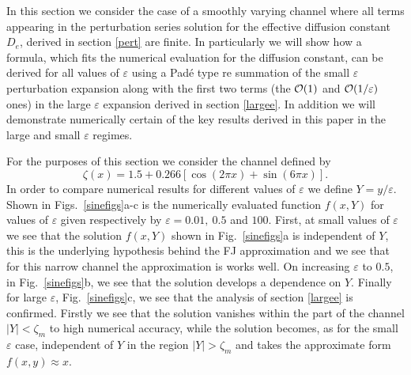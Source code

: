 \documentclass[pre,showpacs,preprintnumbers,amsmath,amssymb,superscriptaddress]{revtex4-1}
\begin{document}
{{In this section we consider the case of a smoothly varying channel where all terms appearing in the perturbation series
solution for the effective diffusion constant $D_e$, derived in section \ref{pert} are finite. In particularly we will show how a formula, which fits the numerical evaluation for the diffusion constant, can be derived for all values of $\varepsilon$ using a Pad\'e type re summation of the small $\varepsilon$ perturbation expansion along with the first two terms (the ${\cal O}(1)$ and ${\cal O}(1/\varepsilon)$ ones) in 
the large $\varepsilon$ expansion derived in section \ref{largee}. In addition we will demonstrate numerically certain of the key results derived in this paper in the large and small $\varepsilon$ regimes. 

For the purposes of this section we consider the channel defined by
\begin{equation}
\zeta(x)=1.5+0.266\left[\cos(2\pi x)+\sin(6\pi x)\right].\label{esch}
\end{equation}
In order to compare numerical results for different values of $\varepsilon$ we define $Y = y/\varepsilon$. Shown in Figs.~\ref{sinefigs}a-c is the numerically evaluated function $f(x,Y)$ for values of $\varepsilon$ given respectively by $\varepsilon= 0.01,\ 0.5$ and $100$. First, at small values of $\varepsilon$ we see that the solution $f(x,Y)$ shown in 
Fig.~\ref{sinefigs}a is independent of $Y$, this is the underlying hypothesis behind the FJ approximation and we see that for this narrow channel the approximation is works well. On increasing $\varepsilon$ to $0.5$, in Fig.~\ref{sinefigs}b, we see that the solution develops a dependence on $Y$. Finally for large $\varepsilon$, Fig.~\ref{sinefigs}c, we see that the analysis of section \ref{largee} is confirmed. Firstly we see that the solution vanishes within the part of the channel $|Y|<\zeta_m$ to high numerical accuracy, while the solution becomes, as for the small $\varepsilon$ case, independent of $Y$ in the region $|Y|>\zeta_m$ and takes the approximate form $f(x,y) \approx x$.



}}
\end{document}
